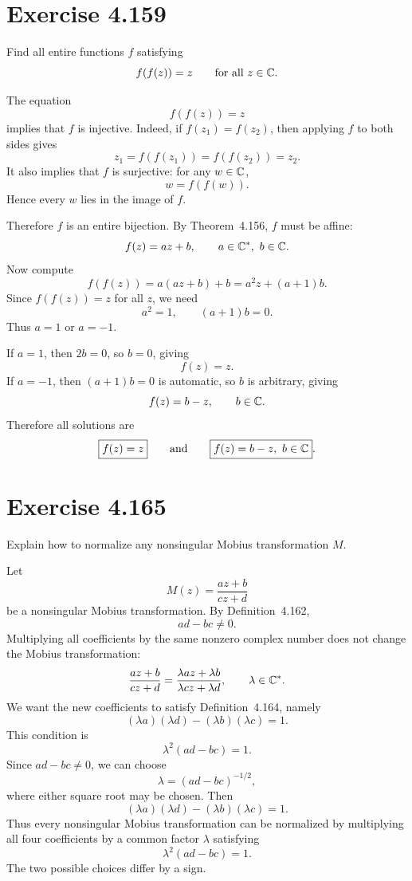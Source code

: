 \documentclass{article}
\begin{document}
\section{Exercise 4.159}

Find all entire functions $f$ satisfying
\[
  f(f(z))=z
  \qquad \text{for all }z\in\mathbb{C}.
\]

\begin{solution}
  The equation
  \[
    f(f(z))=z
  \]
  implies that $f$ is injective. Indeed, if $f(z_1)=f(z_2)$, then applying $f$
  to both sides gives
  \[
    z_1=f(f(z_1))=f(f(z_2))=z_2.
  \]
  It also implies that $f$ is surjective: for any $w\in\mathbb{C}$,
  \[
    w=f(f(w)).
  \]
  Hence every $w$ lies in the image of $f$.

  Therefore $f$ is an entire bijection. By Theorem~4.156, $f$ must be affine:
  \[
    f(z)=az+b,
    \qquad a\in\mathbb{C}^\ast,\ b\in\mathbb{C}.
  \]
  Now compute
  \[
    f(f(z))=a(az+b)+b=a^2z+(a+1)b.
  \]
  Since $f(f(z))=z$ for all $z$, we need
  \[
    a^2=1,
    \qquad
    (a+1)b=0.
  \]
  Thus $a=1$ or $a=-1$.

  If $a=1$, then $2b=0$, so $b=0$, giving
  \[
    f(z)=z.
  \]
  If $a=-1$, then $(a+1)b=0$ is automatic, so $b$ is arbitrary, giving
  \[
    f(z)=b-z,
    \qquad b\in\mathbb{C}.
  \]
  Therefore all solutions are
  \[
    \boxed{f(z)=z}
    \qquad\text{and}\qquad
    \boxed{f(z)=b-z,\ b\in\mathbb{C}}.
  \]
\end{solution}

\section{Exercise 4.165}

Explain how to normalize any nonsingular Mobius transformation $M$.

\begin{solution}
  Let
  \[
    M(z)=\frac{az+b}{cz+d}
  \]
  be a nonsingular Mobius transformation. By Definition~4.162,
  \[
    ad-bc\ne0.
  \]
  Multiplying all coefficients by the same nonzero complex number does not
  change the Mobius transformation:
  \[
    \frac{az+b}{cz+d}
    =
    \frac{\lambda az+\lambda b}{\lambda cz+\lambda d},
    \qquad \lambda\in\mathbb{C}^\ast.
  \]
  We want the new coefficients to satisfy Definition~4.164, namely
  \[
    (\lambda a)(\lambda d)-(\lambda b)(\lambda c)=1.
  \]
  This condition is
  \[
    \lambda^2(ad-bc)=1.
  \]
  Since $ad-bc\ne0$, we can choose
  \[
    \lambda=(ad-bc)^{-1/2},
  \]
  where either square root may be chosen. Then
  \[
    (\lambda a)(\lambda d)-(\lambda b)(\lambda c)=1.
  \]
  Thus every nonsingular Mobius transformation can be normalized by multiplying
  all four coefficients by a common factor $\lambda$ satisfying
  \[
    \lambda^2(ad-bc)=1.
  \]
  The two possible choices differ by a sign.
\end{solution}
\end{document}
